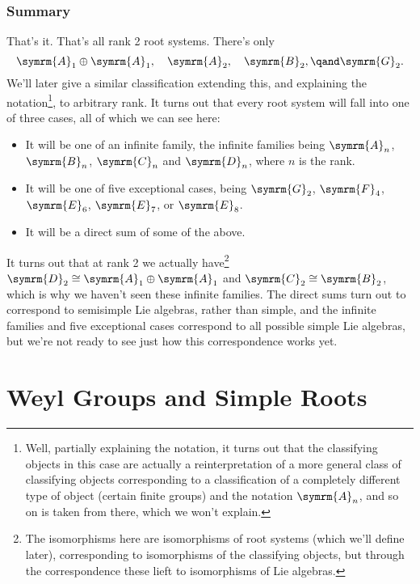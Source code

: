 \documentclass[fleqn]{NotesClass}
\newcommand{\isomorphic}{\cong}
\newcommand{\dynkin}[2]{\symrm{#1}_{#2}}
\begin{document}
    \subsection{Summary}
    That's it.
    That's all rank 2 root systems.
    There's only
    \begin{equation}
        \dynkin{A}{1} \oplus \dynkin{A}{1}, \quad \dynkin{A}{2}, \quad \dynkin{B}{2}, \qand \dynkin{G}{2}.
    \end{equation}
    We'll later give a similar classification extending this, and explaining the notation\footnote{Well, partially explaining the notation, it turns out that the classifying objects in this case are actually a reinterpretation of a more general class of classifying objects corresponding to a classification of a completely different type of object (certain finite groups) and the notation \(\dynkin{A}{n}\), and so on is taken from there, which we won't explain.}, to arbitrary rank.
    It turns out that every root system will fall into one of three cases, all of which we can see here:
    \begin{itemize}
        \item It will be one of an infinite family, the infinite families being \(\dynkin{A}{n}\), \(\dynkin{B}{n}\), \(\dynkin{C}{n}\) and \(\dynkin{D}{n}\), where \(n\) is the rank.
        \item It will be one of five exceptional cases, being \(\dynkin{G}{2}\), \(\dynkin{F}{4}\), \(\dynkin{E}{6}\), \(\dynkin{E}{7}\), or \(\dynkin{E}{8}\).
        \item It will be a direct sum of some of the above.
    \end{itemize}
    It turns out that at rank 2 we actually have\footnote{The isomorphisms here are isomorphisms of root systems (which we'll define later), corresponding to isomorphisms of the classifying objects, but through the correspondence these lieft to isomorphisms of Lie algebras.} \(\dynkin{D}{2} \isomorphic \dynkin{A}{1} \oplus \dynkin{A}{1}\) and \(\dynkin{C}{2} \isomorphic \dynkin{B}{2}\), which is why we haven't seen these infinite families.
    The direct sums turn out to correspond to semisimple Lie algebras, rather than simple, and the infinite families and five exceptional cases correspond to all possible simple Lie algebras, but we're not ready to see just how this correspondence works yet.
    
    \chapter{Weyl Groups and Simple Roots}
    
    
%	
	
	\backmatter
	\renewcommand{\glossaryname}{Acronyms}
	\printglossary[acronym]
	\printindex
\end{document}
